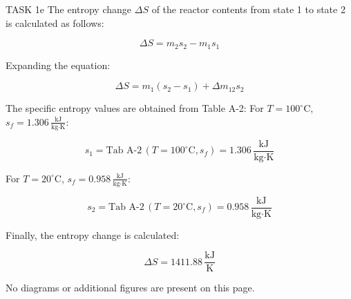 TASK 1e  
The entropy change \( \Delta S \) of the reactor contents from state 1 to state 2 is calculated as follows:  

\[
\Delta S = m_2 s_2 - m_1 s_1
\]

Expanding the equation:  

\[
\Delta S = m_1 (s_2 - s_1) + \Delta m_{12} s_2
\]

The specific entropy values are obtained from Table A-2:  
For \( T = 100^\circ\text{C} \), \( s_f = 1.306 \, \frac{\text{kJ}}{\text{kg·K}} \):  

\[
s_1 = \text{Tab A-2} \, (T = 100^\circ\text{C}, s_f) = 1.306 \, \frac{\text{kJ}}{\text{kg·K}}
\]

For \( T = 20^\circ\text{C} \), \( s_f = 0.958 \, \frac{\text{kJ}}{\text{kg·K}} \):  

\[
s_2 = \text{Tab A-2} \, (T = 20^\circ\text{C}, s_f) = 0.958 \, \frac{\text{kJ}}{\text{kg·K}}
\]

Finally, the entropy change is calculated:  

\[
\Delta S = 1411.88 \, \frac{\text{kJ}}{\text{K}}
\]  

No diagrams or additional figures are present on this page.